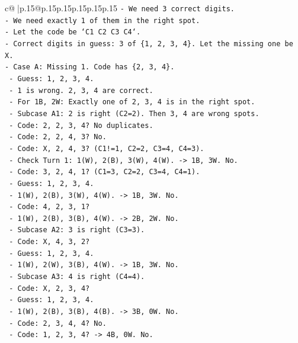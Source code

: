 \documentclass{article}
\begin{document}
{\begin{supertabular}{c@{$\;$}|p{.15\linewidth}@{}p{.15\linewidth}p{.15\linewidth}p{.15\linewidth}p{.15\linewidth}p{.15\linewidth}}
{{{\texttt{{-} We need 3 correct digits.} \\
\texttt{{-} We need exactly 1 of them in the right spot.} \\
\texttt{{-} Let the code be `C1 C2 C3 C4`.} \\
\texttt{{-} Correct digits in guess: 3 of \{1, 2, 3, 4\}. Let the missing one be X.} \\
\texttt{{-} Case A: Missing 1. Code has \{2, 3, 4\}.} \\
\texttt{  {-} Guess: 1, 2, 3, 4.} \\
\texttt{  {-} 1 is wrong. 2, 3, 4 are correct.} \\
\texttt{  {-} For 1B, 2W: Exactly one of 2, 3, 4 is in the right spot.} \\
\texttt{  {-} Subcase A1: 2 is right (C2=2). Then 3, 4 are wrong spots.} \\
\texttt{    {-} Code: 2, 2, 3, 4? No duplicates.} \\
\texttt{    {-} Code: 2, 2, 4, 3? No.} \\
\texttt{    {-} Code: X, 2, 4, 3? (C1!=1, C2=2, C3=4, C4=3).} \\
\texttt{    {-} Check Turn 1: 1(W), 2(B), 3(W), 4(W). {-}> 1B, 3W. No.} \\
\texttt{    {-} Code: 3, 2, 4, 1? (C1=3, C2=2, C3=4, C4=1).} \\
\texttt{      {-} Guess: 1, 2, 3, 4.} \\
\texttt{      {-} 1(W), 2(B), 3(W), 4(W). {-}> 1B, 3W. No.} \\
\texttt{    {-} Code: 4, 2, 3, 1?} \\
\texttt{      {-} 1(W), 2(B), 3(B), 4(W). {-}> 2B, 2W. No.} \\
\texttt{  {-} Subcase A2: 3 is right (C3=3).} \\
\texttt{    {-} Code: X, 4, 3, 2?} \\
\texttt{      {-} Guess: 1, 2, 3, 4.} \\
\texttt{      {-} 1(W), 2(W), 3(B), 4(W). {-}> 1B, 3W. No.} \\
\texttt{  {-} Subcase A3: 4 is right (C4=4).} \\
\texttt{    {-} Code: X, 2, 3, 4?} \\
\texttt{      {-} Guess: 1, 2, 3, 4.} \\
\texttt{      {-} 1(W), 2(B), 3(B), 4(B). {-}> 3B, 0W. No.} \\
\texttt{    {-} Code: 2, 3, 4, 4? No.} \\
\texttt{    {-} Code: 1, 2, 3, 4? {-}> 4B, 0W. No.} \\
}}}
\end{supertabular}}
\end{document}
